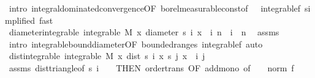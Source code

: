 \begin{isabellebody}
\ {\isacharparenleft}{\kern0pt}intro\ integral{\isacharunderscore}{\kern0pt}dominated{\isacharunderscore}{\kern0pt}convergence{\isacharbrackleft}{\kern0pt}OF\ borel{\isacharunderscore}{\kern0pt}measurable{\isacharunderscore}{\kern0pt}const{\isacharbrackleft}{\kern0pt}of\ {}{\isacharbrackright}{\kern0pt}\ {\isacharunderscore}{\kern0pt}\ integrable{\isacharunderscore}{\kern0pt}{}f{\isacharcomma}{\kern0pt}\ simplified{\isacharbrackright}{\kern0pt}{\isacharparenright}{\kern0pt}\ {\isacharparenleft}{\kern0pt}fast{\isacharplus}{\kern0pt}{\isacharparenright}{\kern0pt}\isanewline
\ \ \isanewline
\ \ \isamarkupfalse%
\ diameter{\isacharunderscore}{\kern0pt}integrable{\isacharcolon}{\kern0pt}\ {\isachardoublequoteopen}integrable\ M\ {\isacharparenleft}{\kern0pt}{\isasymlambda}x{\isachardot}{\kern0pt}\ diameter\ {\isacharbraceleft}{\kern0pt}s\ i\ x\ {\isacharbar}{\kern0pt}\ i{\isachardot}{\kern0pt}\ n\ {\isasymle}\ i{\isacharbraceright}{\kern0pt}{\isacharparenright}{\kern0pt}{\isachardoublequoteclose}\ \ n\ \isamarkupfalse%
\ assms{\isacharparenleft}{\kern0pt}{}{\isacharcomma}{\kern0pt}{}{\isacharparenright}{\kern0pt}\ \isamarkupfalse%
\ {\isacharparenleft}{\kern0pt}intro\ integrable{\isacharunderscore}{\kern0pt}bound{\isacharunderscore}{\kern0pt}diameter{\isacharbrackleft}{\kern0pt}OF\ bounded{\isacharunderscore}{\kern0pt}range{\isacharunderscore}{\kern0pt}s\ integrable{\isacharunderscore}{\kern0pt}{}f{\isacharbrackright}{\kern0pt}{\isacharcomma}{\kern0pt}\ auto{\isacharparenright}{\kern0pt}\isanewline
\isanewline
\ \ \isamarkupfalse%
\ dist{\isacharunderscore}{\kern0pt}integrable{\isacharcolon}{\kern0pt}\ {\isachardoublequoteopen}integrable\ M\ {\isacharparenleft}{\kern0pt}{\isasymlambda}x{\isachardot}{\kern0pt}\ dist\ {\isacharparenleft}{\kern0pt}s\ i\ x{\isacharparenright}{\kern0pt}\ {\isacharparenleft}{\kern0pt}s\ j\ x{\isacharparenright}{\kern0pt}{\isacharparenright}{\kern0pt}{\isachardoublequoteclose}\ \ i\ j\ \isanewline
\ \ \ \ \isamarkupfalse%
\ assms{\isacharparenleft}{\kern0pt}{}{\isacharparenright}{\kern0pt}\ dist{\isacharunderscore}{\kern0pt}triangle{}{\isacharbrackleft}{\kern0pt}of\ {\isachardoublequoteopen}s\ i\ {\isacharunderscore}{\kern0pt}{\isachardoublequoteclose}\ {\isacharunderscore}{\kern0pt}\ {}{\isacharcomma}{\kern0pt}\ THEN\ order{\isacharunderscore}{\kern0pt}trans{\isacharcomma}{\kern0pt}\ OF\ add{\isacharunderscore}{\kern0pt}mono{\isacharcomma}{\kern0pt}\ of\ {\isacharunderscore}{\kern0pt}\ {\isachardoublequoteopen}{}\ {\isacharasterisk}{\kern0pt}\ norm\ {\isacharparenleft}{\kern0pt}f\ {\isacharunderscore}{\kern0pt}{\isacharparenright}{\kern0pt}{\isachardoublequoteclose}{\isacharbrackright}{\kern0pt}\isanewline

\end{isabellebody}
